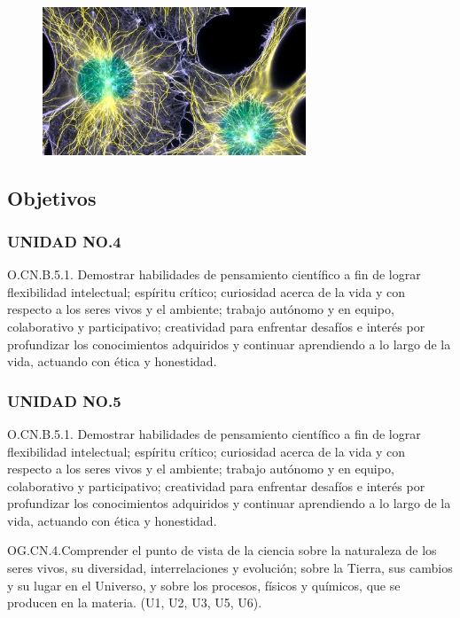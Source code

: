 \documentclass[a4paper, 12pt]{article}
\begin{document}
\begin{figure}[h]
  \includegraphics[width=0.7\textwidth, center]{biologia.jpeg}
\end{figure}

\subsection{Objetivos}

\subsubsection{UNIDAD NO.4}

O.CN.B.5.1. Demostrar habilidades de pensamiento científico a fin de lograr flexibilidad intelectual; espíritu crítico; curiosidad acerca de la vida y con respecto a los seres vivos y el ambiente; trabajo autónomo y en equipo, colaborativo y participativo; creatividad para enfrentar desafíos e interés por profundizar los conocimientos adquiridos y continuar aprendiendo a lo largo de la vida, actuando con ética y honestidad.

\subsubsection{UNIDAD NO.5}

O.CN.B.5.1. Demostrar habilidades de pensamiento científico a fin de lograr flexibilidad intelectual; espíritu crítico; curiosidad acerca de la vida y con respecto a los seres vivos y el ambiente; trabajo autónomo y en equipo, colaborativo y participativo; creatividad para enfrentar desafíos e interés por profundizar los conocimientos adquiridos y continuar aprendiendo a lo largo de la vida, actuando con ética y honestidad.

OG.CN.4.Comprender el punto de vista de la ciencia sobre la naturaleza de los seres vivos, su diversidad, interrelaciones y evolución; sobre la Tierra, sus cambios y su lugar en el Universo, y sobre los procesos, físicos y químicos, que se producen en la materia. (U1, U2, U3, U5, U6).
\end{document}
